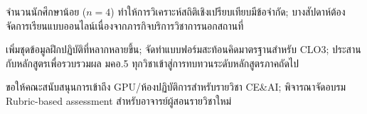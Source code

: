 \documentclass{mko5}
\begin{document}
\mkosectionfour
\begin{mkotextblock}
จำนวนนักศึกษาน้อย ($n=4$) ทำให้การวิเคราะห์สถิติเชิงเปรียบเทียบมีข้อจำกัด;
บางสัปดาห์ต้องจัดการเรียนแบบออนไลน์เนื่องจากภารกิจบริการวิชาการนอกสถานที่
\end{mkotextblock}

\mkosectionfive
\begin{mkotextblock}
เพิ่มชุดข้อมูลฝึกปฏิบัติที่หลากหลายขึ้น; จัดทำแบบฟอร์มสะท้อนคิดมาตรฐานสำหรับ CLO3;
ประสานกับหลักสูตรเพื่อรวบรวมผล มคอ.5 ทุกวิชาเข้าสู่การทบทวนระดับหลักสูตรภาคถัดไป
\end{mkotextblock}

\mkosectionsix
\begin{mkotextblock}
ขอให้คณะสนับสนุนการเข้าถึง GPU/ห้องปฏิบัติการสำหรับรายวิชา CE\&AI;
พิจารณาจัดอบรม Rubric-based assessment สำหรับอาจารย์ผู้สอนรายวิชาใหม่
\end{mkotextblock}

\mkosectionseven
{}
\end{document}
